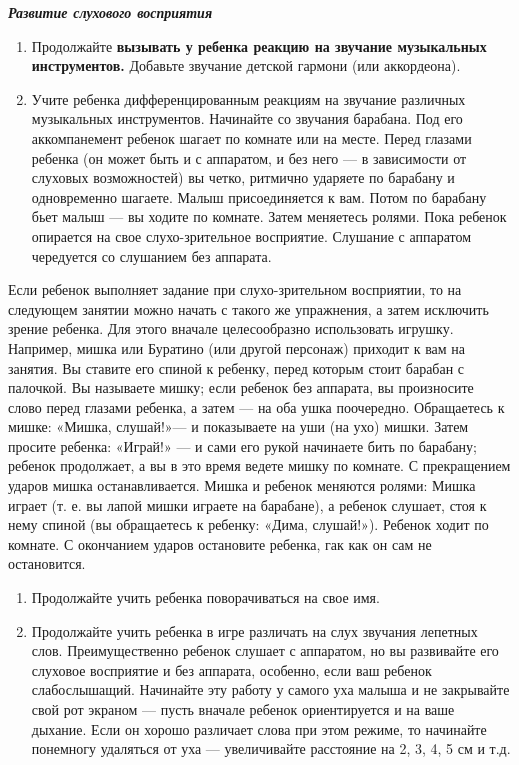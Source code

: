 \documentclass[a5paper]{book}
\renewcommand{\emph}[1]{\textit{#1}}
\begin{document}
\emph{\textbf{Развитие слухового восприятия}}


\begin{enumerate}
\def\labelenumi{\arabic{enumi}.}
\item
  
  Продолжайте \textbf{вызывать у ребенка реакцию на звучание музыкальных
  инструментов.} Добавьте звучание детской гармони (или аккордеона).
  
\item
  
  Учите ребенка дифференцированным реакциям на звучание различных
  музыкальных инструментов. Начинайте со звучания барабана. Под его
  аккомпанемент ребенок шагает по комнате или на месте. Перед глазами
  ребенка (он может быть и с аппаратом, и без него --- в зависимости от
  слуховых возможностей) вы четко, ритмично ударяете по барабану и
  одновременно шагаете. Малыш присоединяется к вам. Потом по барабану
  бьет малыш --- вы ходите по комнате. Затем меняетесь ролями. Пока
  ребенок опирается на свое слухо-зрительное восприятие. Слушание с
  аппаратом чередуется со слушанием без аппарата.
  
\end{enumerate}


Если ребенок выполняет задание при слухо-зрительном восприятии, то на
следующем занятии можно начать с такого же упражнения, а затем исключить
зрение ребенка. Для этого вначале целесообразно использовать игрушку.
Например, мишка или Буратино (или другой персонаж) приходит к вам на
занятия. Вы ставите его спиной к ребенку, перед которым стоит барабан с
палочкой. Вы называете мишку; если ребенок без аппарата, вы произносите
слово перед глазами ребенка, а затем --- на оба ушка поочередно.
Обращаетесь к мишке: «Мишка, слушай!»--- и показываете на уши (на ухо)
мишки. Затем просите ребенка: «Играй!» --- и сами его рукой начинаете
бить по барабану; ребенок продолжает, а вы в это время ведете мишку по
комнате. С прекращением ударов мишка останавливается. Мишка и ребенок
меняются ролями: Мишка играет (т. е. вы лапой мишки играете на
барабане), а ребенок слушает, стоя к нему спиной (вы обращаетесь к
ребенку: «Дима, слушай!»). Ребенок ходит по комнате. С окончанием ударов
остановите ребенка, гак как он сам не остановится.


\begin{enumerate}
\def\labelenumi{\arabic{enumi}.}
\setcounter{enumi}{2}
\item
  
  Продолжайте учить ребенка поворачиваться на свое имя.
  
\item
  
  Продолжайте учить ребенка в игре различать на слух звучания лепетных
  слов. Преимущественно ребенок слушает с аппаратом, но вы развивайте
  его слуховое восприятие и без аппарата, особенно, если ваш ребенок
  слабослышащий. Начинайте эту работу у самого уха малыша и не
  закрывайте свой рот экраном --- пусть вначале ребенок ориентируется и
  на ваше дыхание. Если он хорошо различает слова при этом режиме, то
  начинайте понемногу удаляться от уха --- увеличивайте расстояние на 2,
  3, 4, 5 см и т.д.
  
\end{enumerate}
\end{document}
